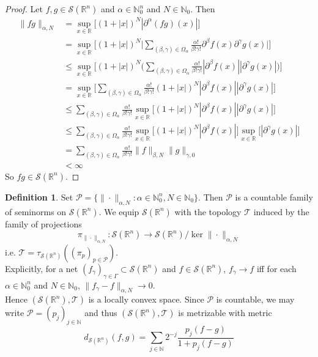 \documentclass{book}
\theoremstyle{definition}
\newtheorem{defn}[definition]{Definition}
\newcommand{\al}{\alpha}
\newcommand{\be}{\beta}
\newcommand{\gam}{\gamma}
\newcommand{\Gam}{\Gamma}
\newcommand{\Om}{\Omega}
\newcommand{\N}{\mathbb{N}}
\newcommand{\R}{\mathbb{R}}
\newcommand{\MP}{\mathcal{P}}
\newcommand{\MS}{\mathcal{S}}
\newcommand{\MT}{\mathcal{T}}
\DeclareMathOperator*{\0}{\mbf{0}}
\DeclareMathOperator*{\1}{\mbf{1}}
\newcommand{\p}{\partial}
\begin{document}
	\begin{proof}
		Let $f,g \in \MS(\R^n)$ and $\al \in \N_0^n$ and $N \in  \N_0$. Then 
		\begin{align*}
			\|fg\|_{\al, N}
			& = \sup_{x \in \R} \bigg[ (1 + |x|)^N|\p^{\al}(fg)(x)| \bigg] \\
			& = \sup_{x \in \R} \bigg[ (1 + |x|)^N \bigg | \sum\limits_{(\be, \gam) \in \Om_{\al}} \frac{\al!}{\be! \gam!}\p^{\be}f (x) \p^{\gam}g (x) \bigg|  \bigg] \\
			& \leq \sup_{x \in \R} \bigg[ (1 + |x|)^N \bigg(\sum\limits_{(\be, \gam) \in \Om_{\al}} \frac{\al!}{\be! \gam!}|\p^{\be}f (x)| |\p^{\gam}g (x)| \bigg) \bigg] \\
			& = \sup_{x \in \R} \bigg[   \sum\limits_{(\be, \gam) \in \Om_{\al}} \frac{\al!}{\be! \gam!} (1 + |x|)^N|\p^{\be}f(x)| |\p^{\gam}g (x)| \bigg] \\
			& \leq \sum\limits_{(\be, \gam) \in \Om_{\al}} \frac{\al!}{\be! \gam!} \sup_{x \in \R} \bigg[ (1 + |x|)^N|\p^{\be}f(x)| |\p^{\gam}g (x)| \bigg] \\
			& \leq \sum\limits_{(\be, \gam) \in \Om_{\al}} \frac{\al!}{\be! \gam!} \sup_{x \in \R} \bigg[ (1 + |x|)^N|\p^{\be}f(x)| \bigg]  \sup_{x \in \R} \bigg[|\p^{\gam}g (x) | \bigg] \\
			& = \sum\limits_{(\be, \gam) \in \Om_{\al}} \frac{\al!}{\be! \gam!}  \|f\|_{\be, N} \|g\|_{\gam, 0} \\
			& < \infty
		\end{align*} 
		So $fg \in \MS(\R^n)$.
	\end{proof}

	\begin{defn}
		Set $\MP = \{\|\cdot\|_{\al, N}: \al \in \N_0^n, N \in \N_0 \}$. Then $\MP$ is a countable family of seminorms on $\MS(\R^n)$. We equip $\MS(\R^n)$ with the topology $\MT$ induced by the family of projections $$\pi_{\| \cdot \|_{\al,N}}: \MS(\R^n) \rightarrow \MS(\R^n) / \ker \|\cdot\|_{\al,N} $$ 
		i.e. $\MT = \tau_{\MS(\R^n)}((\pi_{p})_{p \in \MP})$.  \\
		Explicitly, for a net $(f_{\gam})_{\gam \in \Gam} \subset \MS(\R^n)$ and $f \in \MS(\R^n)$, $f_{\gam} \rightarrow f$ iff for each $\al \in \N_0^n$ and $N \in  \N_0$, $\|f_{\gam} - f\|_{\al, N} \rightarrow 0$. \\
		Hence $(\MS(\R^n), \MT)$ is a locally convex space. Since $\MP$ is countable, we may write $\MP = (p_j)_{j \in \N}$ and thus $(\MS(\R^n), \MT)$ is metrizable with metric
		$$d_{\MS(\R^n)}(f,g) = \sum_{j \in \N} 2^{-j} \frac{p_j(f-g)}{1 + p_j(f-g)}$$
	\end{defn}
\end{document}

